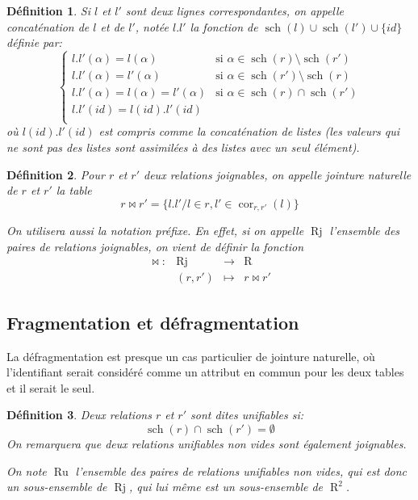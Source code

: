 \documentclass[french]{article}
\DeclareMathOperator{\R}{R}
\DeclareMathOperator{\s}{sch}
\DeclareMathOperator{\ru}{Ru}
\DeclareMathOperator{\cor}{cor}
\DeclareMathOperator{\rj}{Rj}
\newtheorem{defi}{Définition}
\begin{document}
\begin{defi}
	Si $l$ et $l'$ sont deux lignes correspondantes,
	on appelle \emph{concaténation de $l$ et de $l'$},
	notée $l.l'$ la fonction de $\s(l) \cup \s(l') \cup \{id\}$
	définie par:
	$$
	\left\lbrace
	\begin{array}{ll}
	l.l'(\alpha)  = l(\alpha) & \text{si $\alpha \in \s(r) \setminus \s(r')$} \\
	l.l'(\alpha)  = l'(\alpha) & \text{si $\alpha \in \s(r') \setminus \s(r)$} \\
	l.l'(\alpha)  = l(\alpha) = l'(\alpha) & \text{si $\alpha \in \s(r) \cap \s(r')$} \\
	l.l'(id)  = l(id).l'(id) &  \\
	\end{array}
	\right.
	$$
	où $l(id).l'(id)$ est compris comme la concaténation de listes
	(les valeurs qui ne sont pas des listes sont assimilées
	à des listes avec un seul élément).
\end{defi}

\begin{defi}
	Pour $r$ et $r'$ deux relations joignables,
	on appelle \emph{jointure naturelle}
	de $r$ et $r'$ la table
	$$
	r \Join r' = \{l.l' / l \in r, l' \in \cor_{r, r'}(l) \}
	$$
	
	On utilisera aussi la notation préfixe.
	En effet, si on appelle $\rj$ l'ensemble
	des paires de relations joignables,
	on vient de définir la fonction
	$$
	\begin{array}{llcl}
	\Join : & \rj & \rightarrow & \R \\
			& (r, r') & \mapsto & r \Join r'
	\end{array}
	$$
\end{defi}

\subsection*{Fragmentation et défragmentation}
La défragmentation est presque un cas particulier de jointure naturelle,
où l'identifiant serait considéré comme un attribut en commun pour les deux tables
et il serait le seul.

\begin{defi}
	Deux relations $r$ et $r'$ sont dites \emph{unifiables}
	si:
	$$
	\s(r) \cap \s(r') = \emptyset
	$$
	On remarquera que deux relations unifiables non vides sont également joignables.
	
	On note $\ru$ l'ensemble des paires de relations unifiables non vides,
	qui est donc un sous-ensemble de $\rj$, qui lui même
	est un sous-ensemble de $\R^2$.
\end{defi}
\end{document}
